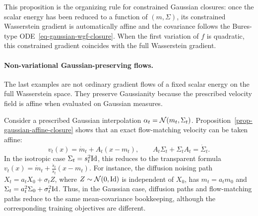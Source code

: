 This proposition is the organizing rule for constrained Gaussian closures: once the scalar energy has been reduced to a function of $(m,\Sigma)$, its constrained Wasserstein gradient is automatically affine and the covariance follows the Bures-type ODE~\eqref{eq-gaussian-wgf-closure}. When the first variation of $f$ is quadratic, this constrained gradient coincides with the full Wasserstein gradient.


\paragraph{Non-variational Gaussian-preserving flows.}

The last examples are not ordinary gradient flows of a fixed scalar energy on the full Wasserstein space. They preserve Gaussianity because the prescribed velocity field is affine when evaluated on Gaussian measures.

\begin{example}
	Consider a prescribed Gaussian interpolation $\alpha_t=\mathcal{N}(m_t,\Sigma_t)$. Proposition~\ref{prop-gaussian-affine-closure} shows that an exact flow-matching velocity can be taken affine:
	\[
		v_t(x)=\dot m_t+A_t(x-m_t),
		\qquad
		A_t\Sigma_t+\Sigma_t A_t=\dot\Sigma_t.
	\]
	In the isotropic case $\Sigma_t=s_t^2\mathrm{Id}$, this reduces to the transparent formula $v_t(x)=\dot m_t+\frac{\dot s_t}{s_t}(x-m_t)$. For instance, the diffusion noising path $X_t=a_tX_0+\sigma_t Z$, where $Z\sim\mathcal{N}(0,\mathrm{Id})$ is independent of $X_0$,
	has $m_t=a_tm_0$ and $\Sigma_t=a_t^2\Sigma_0+\sigma_t^2\mathrm{Id}$. Thus, in the Gaussian case, diffusion paths and flow-matching paths reduce to the same mean-covariance bookkeeping, although the corresponding training objectives are different.
\end{example}

